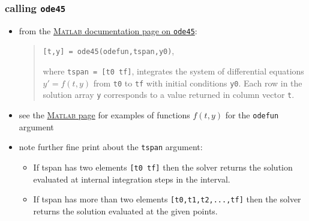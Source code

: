 \documentclass[urlcolor=blue,dvipsnames]{beamer}
\newcommand{\Matlab}{\textsc{Matlab}\xspace}
\begin{document}
\begin{frame}[fragile]
\frametitle{calling \texttt{ode45}}

\begin{itemize}
\item from the \href{https://www.mathworks.com/help/matlab/ref/ode45.html}{\Matlab documentation page on \texttt{ode45}}:

\medskip
\begin{quote}\normalfont
\texttt{[t,y] = ode45(odefun,tspan,y0)},

\medskip
where \texttt{tspan = [t0 tf]}, integrates the system of differential equations $y'=f(t,y)$ from \texttt{t0} to \texttt{tf} with initial conditions \texttt{y0}. Each row in the solution array \texttt{y} corresponds to a value returned in column vector \texttt{t}.
\end{quote}
\item see the \href{https://www.mathworks.com/help/matlab/ref/ode45.html}{\Matlab page} for examples of functions $f(t,y)$ for the \texttt{odefun} argument
\item note further fine print about the \texttt{tspan} argument:
   \begin{itemize}
   \footnotesize
   \item If tspan has two elements \texttt{[t0 tf]} then the solver returns the solution evaluated at internal integration steps in the interval.
   \item If tspan has more than two elements \texttt{[t0,t1,t2,...,tf]} then the solver returns the solution evaluated at the given points.
   \end{itemize}
\end{itemize}
\end{frame}
\end{document}
